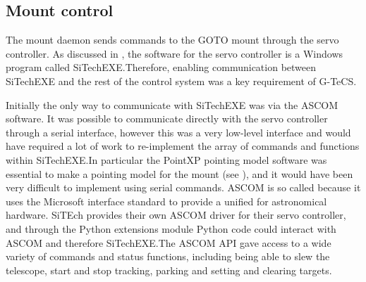 \begin{colsection}
\begin{colsection}
\end{colsection}


\subsection{Mount control}
\label{sec:mount}
\begin{colsection}

The mount daemon sends commands to the GOTO mount through the  servo controller. As discussed in , the software for the servo controller is a Windows program called SiTechEXE.\@ Therefore, enabling communication between SiTechEXE and the rest of the control system was a key requirement of G-TeCS.\@

Initially the only way to communicate with SiTechEXE was via the ASCOM software. It was possible to communicate directly with the servo controller through a serial interface, however this was a very low-level interface and would have required a lot of work to re-implement the array of commands and functions within SiTechEXE.\@ In particular the PointXP pointing model software was essential to make a pointing model for the mount (see ), and it would have been very difficult to implement using serial commands. ASCOM is so called because it uses the Microsoft  interface standard to provide a unified  for astronomical hardware. SiTEch provides their own ASCOM driver for their servo controller, and through the Python  extensions module Python code could interact with ASCOM and therefore SiTechEXE.\@ The ASCOM API gave access to a wide variety of commands and status functions, including being able to slew the telescope, start and stop tracking, parking and setting and clearing targets.


\end{colsection}
\end{colsection}
